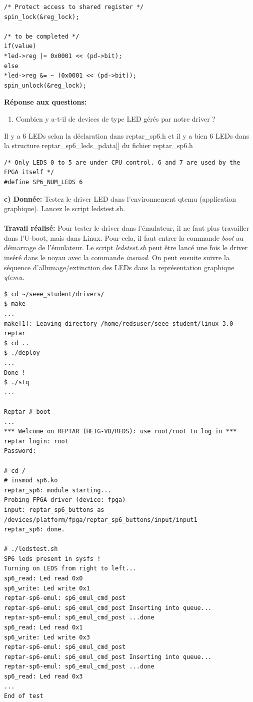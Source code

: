 \begin{lstlisting}
/* Protect access to shared register */
spin_lock(&reg_lock);

/* to be completed */
if(value)
*led->reg |= 0x0001 << (pd->bit);
else
*led->reg &= ~ (0x0001 << (pd->bit));
spin_unlock(&reg_lock);
\end{lstlisting}
\textbf{Réponse aux questions: }
\begin{enumerate}
	\item Combien y a-t-il de devices de type LED gérés par notre driver ?\\
\end{enumerate}
Il y a 6 LEDs selon la déclaration dans reptar\_sp6.h et il y a bien 6 LEDs dans la structure reptar\_sp6\_leds\_pdata[] du fichier reptar\_sp6.h
\begin{lstlisting}
/* Only LEDS 0 to 5 are under CPU control. 6 and 7 are used by the FPGA itself */
#define SP6_NUM_LEDS 6
\end{lstlisting}
\textbf{c) Donnée: }Testez le driver LED dans l'environnement qtemu (application graphique). Lancez le script
ledstest.sh.\\\\
\textbf{Travail réalisé: }Pour tester le driver dans l'émulateur, il ne faut plus travailler dans l'U-boot, mais dans Linux. Pour cela, il faut entrer la commande \textit{boot} au démarrage de l'émulateur. Le script \textit{ledstest.sh} peut être lancé une fois le driver inséré dans le noyau avec la commande \textit{insmod}. On peut ensuite suivre la séquence d'allumage/extinction des LEDs dans la représentation graphique \textit{qtemu}.
\begin{lstlisting}
$ cd ~/seee_student/drivers/
$ make
...
make[1]: Leaving directory /home/redsuser/seee_student/linux-3.0-reptar
$ cd ..
$ ./deploy
...
Done !
$ ./stq
...

Reptar # boot
...
*** Welcome on REPTAR (HEIG-VD/REDS): use root/root to log in ***
reptar login: root
Password: 

# cd /
# insmod sp6.ko 
reptar_sp6: module starting...
Probing FPGA driver (device: fpga)
input: reptar_sp6_buttons as /devices/platform/fpga/reptar_sp6_buttons/input/input1
reptar_sp6: done.

# ./ledstest.sh 
SP6 leds present in sysfs !
Turning on LEDS from right to left...
sp6_read: Led read 0x0
sp6_write: Led write 0x1
reptar-sp6-emul: sp6_emul_cmd_post
reptar-sp6-emul: sp6_emul_cmd_post Inserting into queue...
reptar-sp6-emul: sp6_emul_cmd_post ...done
sp6_read: Led read 0x1
sp6_write: Led write 0x3
reptar-sp6-emul: sp6_emul_cmd_post
reptar-sp6-emul: sp6_emul_cmd_post Inserting into queue...
reptar-sp6-emul: sp6_emul_cmd_post ...done
sp6_read: Led read 0x3
...
End of test
\end{lstlisting}
